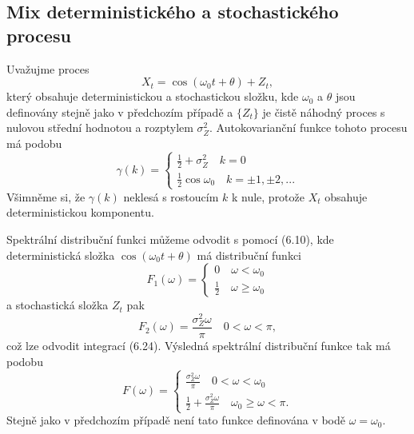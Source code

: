 \subsection{Mix deterministického a stochastického procesu}

Uvažujme proces
\begin{equation}
X_t = \cos(\omega_0 t + \theta) + Z_t,
\end{equation}
který obsahuje deterministickou a stochastickou složku, kde $\omega_0$ a $\theta$ jsou definovány stejně jako v předchozím případě a $\{Z_t\}$ je čistě náhodný proces s nulovou střední hodnotou a rozptylem $\sigma_Z^2$. Autokovarianční funkce tohoto procesu má podobu
\begin{equation}
\gamma(k) =
\begin{cases}
\frac{1}{2} + \sigma_Z^2 \quad k = 0\\
\frac{1}{2} \cos \omega_0 \quad k = \pm 1, \pm 2, ...
\end{cases}
\end{equation}
Všimněme si, že $\gamma(k)$ neklesá s rostoucím $k$ k nule, protože $X_t$ obsahuje deterministickou komponentu.

Spektrální distribuční funkci můžeme odvodit s pomocí (6.10), kde deterministická složka $\cos (\omega_0 t + \theta)$ má distribuční funkci
\begin{equation}
F_1(\omega) =
\begin{cases}
0 \quad \omega < \omega_0\\
\frac{1}{2} \quad \omega \ge \omega_0
\end{cases}
\end{equation}
a stochastická složka $Z_t$ pak
\begin{equation}
F_2(\omega) = \frac{\sigma_Z^2 \omega}{\pi} \quad 0 < \omega < \pi,
\end{equation}
což lze odvodit integrací (6.24). Výsledná spektrální distribuční funkce tak má podobu
\begin{equation}
F(\omega) =
\begin{cases}
\frac{\sigma_Z^2 \omega}{\pi} \quad 0 < \omega < \omega_0\\
\frac{1}{2} + \frac{\sigma_Z^2 \omega}{\pi} \quad \omega_0 \ge \omega < \pi.
\end{cases}
\end{equation}
Stejně jako v předchozím případě není tato funkce definována v bodě $\omega = \omega_0$.
